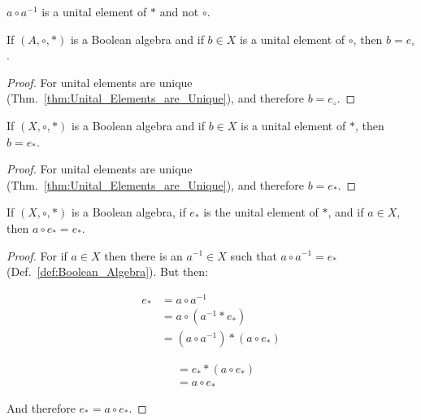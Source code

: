     $a\circ{a}^{\minus{1}}$ is a unital element of $*$ and not $\circ$.
    \begin{theorem}
        If $(A,\circ,*)$ is a Boolean algebra and if $b\in{X}$ is a
        unital element of $\circ$, then $b=e_{\circ}$.
    \end{theorem}
    \begin{proof}
        For unital elements are unique
        (Thm.~\ref{thm:Unital_Elements_are_Unique}), and therefore
        $b=e_{\circ}$.
    \end{proof}
    \begin{theorem}
        If $(X,\circ,*)$ is a Boolean algebra and if $b\in{X}$ is a
        unital element of $*$, then $b=e_{*}$.
    \end{theorem}
    \begin{proof}
        For unital elements are unique
        (Thm.~\ref{thm:Unital_Elements_are_Unique}), and therefore $b=e_{*}$.
    \end{proof}
    \begin{theorem}
        \label{thm:Bool_Alg_Boundary_of_Circ}%
        If $(X,\circ,*)$ is a Boolean algebra, if $e_{*}$ is the unital
        element of $*$, and if $a\in{X}$, then $a\circ{e}_{*}=e_{*}$.
    \end{theorem}
    \begin{proof}
        For if $a\in{X}$ then there is an $a^{\minus{1}}\in{X}$ such that
        $a\circ{a}^{\minus{1}}=e_{*}$ (Def.~\ref{def:Boolean_Algebra}).
        But then:
        \par\vspace{-2.5ex}
        \begin{minipage}[t]{0.51\textwidth}
            \centering
            \begin{align}
                e_{*}&=a\circ{a}^{\minus{1}}
                \tag{Complement}\\
                &=a\circ(a^{\minus{1}}*e_{*})
                \tag{Identity}\\
                &=(a\circ{a}^{\minus{1}})*(a\circ{e}_{*})
                \tag{Distributivity}
            \end{align}
        \end{minipage}
        \hfill
        \begin{minipage}[t]{0.47\textwidth}
            \centering
            \begin{align}
                &=e_{*}*(a\circ{e}_{*})
                \tag{Complement}\\
                &=a\circ{e}_{*}
                \tag{Identity}
            \end{align}
        \end{minipage}
        \par\vspace{2.5ex}
        And therefore $e_{*}=a\circ{e}_{*}$.
    \end{proof}
